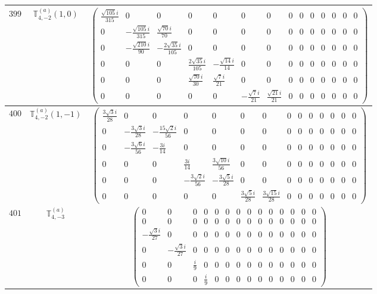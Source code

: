 \documentclass[fleqn,8pt,landscape]{jsarticle}
\begin{document}
\begin{center}
\begin{longtable}{ccc}
$ 399 $ & $ \mathbb{T}_{4,-2}^{(a)}(1,0) $ & $ \begin{pmatrix} \frac{\sqrt{105} i}{315} & 0 & 0 & 0 & 0 & 0 & 0 & 0 & 0 & 0 & 0 & 0 & 0 & 0 \\ 0 & - \frac{\sqrt{105} i}{315} & \frac{\sqrt{70} i}{70} & 0 & 0 & 0 & 0 & 0 & 0 & 0 & 0 & 0 & 0 & 0 \\ 0 & - \frac{\sqrt{210} i}{90} & - \frac{2 \sqrt{35} i}{105} & 0 & 0 & 0 & 0 & 0 & 0 & 0 & 0 & 0 & 0 & 0 \\ 0 & 0 & 0 & \frac{2 \sqrt{35} i}{105} & - \frac{\sqrt{14} i}{14} & 0 & 0 & 0 & 0 & 0 & 0 & 0 & 0 & 0 \\ 0 & 0 & 0 & \frac{\sqrt{70} i}{30} & \frac{\sqrt{7} i}{21} & 0 & 0 & 0 & 0 & 0 & 0 & 0 & 0 & 0 \\ 0 & 0 & 0 & 0 & 0 & - \frac{\sqrt{7} i}{21} & \frac{\sqrt{21} i}{21} & 0 & 0 & 0 & 0 & 0 & 0 & 0 \end{pmatrix} $ \\ \hline
$ 400 $ & $ \mathbb{T}_{4,-2}^{(a)}(1,-1) $ & $ \begin{pmatrix} \frac{3 \sqrt{3} i}{28} & 0 & 0 & 0 & 0 & 0 & 0 & 0 & 0 & 0 & 0 & 0 & 0 & 0 \\ 0 & - \frac{3 \sqrt{3} i}{28} & - \frac{15 \sqrt{2} i}{56} & 0 & 0 & 0 & 0 & 0 & 0 & 0 & 0 & 0 & 0 & 0 \\ 0 & - \frac{3 \sqrt{6} i}{56} & - \frac{3 i}{14} & 0 & 0 & 0 & 0 & 0 & 0 & 0 & 0 & 0 & 0 & 0 \\ 0 & 0 & 0 & \frac{3 i}{14} & \frac{3 \sqrt{10} i}{56} & 0 & 0 & 0 & 0 & 0 & 0 & 0 & 0 & 0 \\ 0 & 0 & 0 & - \frac{3 \sqrt{2} i}{56} & - \frac{3 \sqrt{5} i}{28} & 0 & 0 & 0 & 0 & 0 & 0 & 0 & 0 & 0 \\ 0 & 0 & 0 & 0 & 0 & \frac{3 \sqrt{5} i}{28} & \frac{3 \sqrt{15} i}{28} & 0 & 0 & 0 & 0 & 0 & 0 & 0 \end{pmatrix} $ \\ \hline
$ 401 $ & $ \mathbb{T}_{4,-3}^{(a)} $ & $ \begin{pmatrix} 0 & 0 & 0 & 0 & 0 & 0 & 0 & 0 & 0 & 0 & 0 & 0 & 0 & 0 \\ 0 & 0 & 0 & 0 & 0 & 0 & 0 & 0 & 0 & 0 & 0 & 0 & 0 & 0 \\ - \frac{\sqrt{3} i}{27} & 0 & 0 & 0 & 0 & 0 & 0 & 0 & 0 & 0 & 0 & 0 & 0 & 0 \\ 0 & - \frac{\sqrt{3} i}{27} & 0 & 0 & 0 & 0 & 0 & 0 & 0 & 0 & 0 & 0 & 0 & 0 \\ 0 & 0 & \frac{i}{9} & 0 & 0 & 0 & 0 & 0 & 0 & 0 & 0 & 0 & 0 & 0 \\ 0 & 0 & 0 & \frac{i}{9} & 0 & 0 & 0 & 0 & 0 & 0 & 0 & 0 & 0 & 0 \end{pmatrix} $ \\ \hline

\end{longtable}
\end{center}
\end{document}
